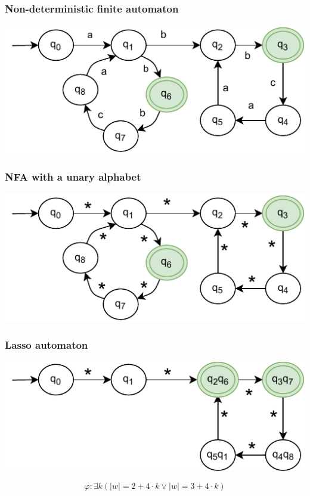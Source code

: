 \begin{frame}
     {
        \frametitle{Non-deterministic finite automaton}
        \center\includegraphics[scale=1.2]{img/diagrams-Non-deterministic-Automaton.pdf}
    }
     {
        \frametitle{NFA with a unary alphabet}
        \center\includegraphics[scale=1.2]{img/diagrams-NFA with Unary Alphabet.pdf}
    }
     {
        \frametitle{Lasso automaton}
        \center\includegraphics[scale=1.2]{img/diagrams-Lasso Automaton.pdf}
        
        \large $$\varphi: \exists k (|w| = 2 + 4 \cdot k \lor |w| = 3 + 4 \cdot k)$$
    }
\end{frame}

